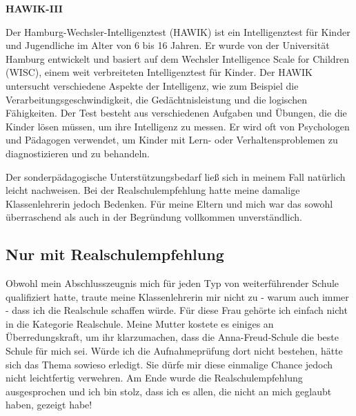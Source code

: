 \documentclass[fontsize=14pt,a4paper,headinclude,DIV=calc,automark]{scrbook}
\begin{document}
\begin{mdframed}[
    linewidth=0.3pt,         %
    linecolor=rahmenlinie,   %
    leftmargin=0, rightmargin=0,
    innertopmargin=12pt, innerbottommargin=12pt,
    innerleftmargin=12pt, innerrightmargin=12pt,
    backgroundcolor=white
]
\small\sffamily
\setlength{\parindent}{0pt} %

\textbf{HAWIK-III}

\vspace{0.5\baselineskip}

Der Hamburg-Wechsler-Intelligenztest (HAWIK) ist ein Intelligenztest für Kinder und Jugendliche im Alter von 6 bis 16 Jahren. Er wurde von der Universität Hamburg entwickelt und basiert auf dem Wechsler Intelligence Scale for Children (WISC), einem weit verbreiteten Intelligenztest für Kinder. Der HAWIK untersucht verschiedene Aspekte der Intelligenz, wie zum Beispiel die Verarbeitungsgeschwindigkeit, die Gedächtnisleistung und die logischen Fähigkeiten. Der Test besteht aus verschiedenen Aufgaben und Übungen, die die Kinder lösen müssen, um ihre Intelligenz zu messen. Er wird oft von Psychologen und Pädagogen verwendet, um Kinder mit Lern- oder Verhaltensproblemen zu diagnostizieren und zu behandeln.

\end{mdframed}

\vspace{0.8\baselineskip}

Der sonderpädagogische Unterstützungsbedarf ließ sich in meinem Fall natürlich leicht nachweisen. Bei der Realschulempfehlung hatte meine damalige Klassenlehrerin jedoch Bedenken. Für meine Eltern und mich war das sowohl überraschend als auch in der Begründung vollkommen unverständlich.

\subsection{Nur mit Realschulempfehlung}

Obwohl mein Abschlusszeugnis mich für jeden Typ von weiterführender Schule qualifiziert hatte, traute meine Klassenlehrerin mir nicht zu - warum auch immer - dass ich die Realschule schaffen würde. Für diese Frau gehörte ich einfach nicht in die Kategorie Realschule. Meine Mutter kostete es einiges an Überredungskraft, um ihr klarzumachen, dass die Anna-Freud-Schule die beste Schule für mich sei. Würde ich die Aufnahmeprüfung dort nicht bestehen, hätte sich das Thema sowieso erledigt. Sie dürfe mir diese einmalige Chance jedoch nicht leichtfertig verwehren. Am Ende wurde die Realschulempfehlung ausgesprochen und ich bin stolz, dass ich es allen, die nicht an mich geglaubt haben, gezeigt habe!
\end{document}
